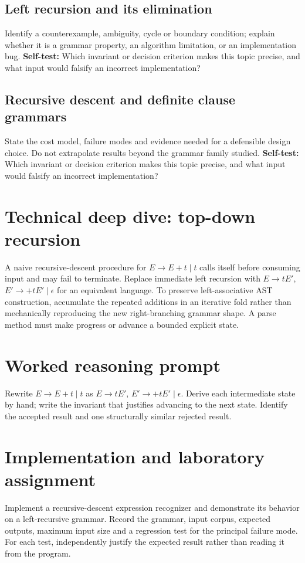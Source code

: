 \documentclass[11pt,letterpaper]{article}
\begin{document}
\subsection{Left recursion and its elimination}
Identify a counterexample, ambiguity, cycle or boundary condition; explain whether it is a grammar property, an algorithm limitation, or an implementation bug.
\textbf{Self-test:} Which invariant or decision criterion makes this topic precise, and what input would falsify an incorrect implementation?
\subsection{Recursive descent and definite clause grammars}
State the cost model, failure modes and evidence needed for a defensible design choice. Do not extrapolate results beyond the grammar family studied.
\textbf{Self-test:} Which invariant or decision criterion makes this topic precise, and what input would falsify an incorrect implementation?
\section{Technical deep dive: top-down recursion}
A naive recursive-descent procedure for $E\to E+t\mid t$ calls itself before consuming input and may fail to terminate. Replace immediate left recursion with $E\to tE'$, $E'\to +tE'\mid\epsilon$ for an equivalent language. To preserve left-associative AST construction, accumulate the repeated additions in an iterative fold rather than mechanically reproducing the new right-branching grammar shape. A parse method must make progress or advance a bounded explicit state.
\section{Worked reasoning prompt}
Rewrite $E\to E+t\mid t$ as $E\to tE\prime$, $E\prime\to +tE\prime\mid\epsilon$. Derive each intermediate state by hand; write the invariant that justifies advancing to the next state. Identify the accepted result and one structurally similar rejected result.
\section{Implementation and laboratory assignment}
Implement a recursive-descent expression recognizer and demonstrate its behavior on a left-recursive grammar. Record the grammar, input corpus, expected outputs, maximum input size and a regression test for the principal failure mode. For each test, independently justify the expected result rather than reading it from the program.
\end{document}
